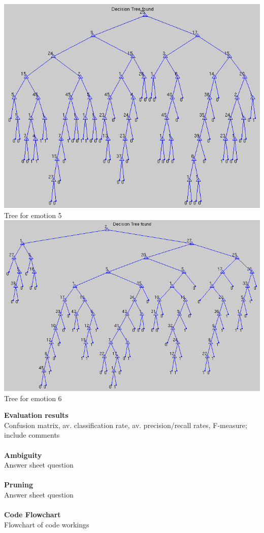 \documentclass[12pt]{article}
\begin{document}
\begin{center}
  \includegraphics[scale=0.28]{report-images/tree5.png} \\
  Tree for emotion 5 \\
  \vspace{\baselineskip}
  \includegraphics[scale=0.28]{report-images/tree6.png} \\
  Tree for emotion 6 \\
  \vspace{\baselineskip}
\end{center}

{\bf Evaluation results} \\
Confusion matrix, av. classification rate, av. precision/recall rates, F-measure; include comments \\ \\

{\bf Ambiguity} \\
Answer sheet question \\ \\

{\bf Pruning} \\
Answer sheet question\\ \\

{\bf Code Flowchart} \\
Flowchart of code workings\\ \\
\end{document}
